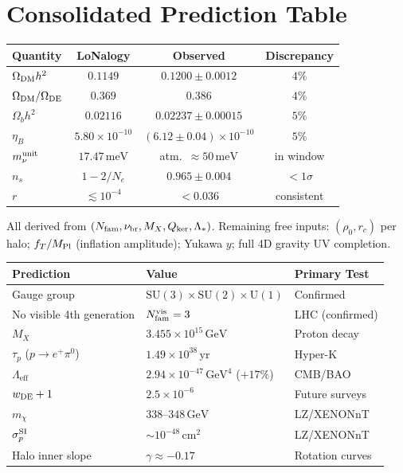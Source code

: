 \documentclass[12pt]{article}
\theoremstyle{plain}
\theoremstyle{definition}
\numberwithin{equation}{section}
\newcommand{\br}{\mathrm{br}}
\newcommand{\kker}{\mathrm{ker}}
\newcommand{\eff}{\mathrm{eff}}
\begin{document}
\section{Consolidated Prediction Table}\label{sec:summary2}

\begin{center}
\begin{tabular}{lccc}
\toprule
Quantity & LoNalogy & Observed & Discrepancy\\
\midrule
$\Omega_{\rm DM}h^2$ & $0.1149$ & $0.1200\pm0.0012$ & $4\%$\\
$\Omega_{\rm DM}/\Omega_{\rm DE}$ & $0.369$ & $0.386$ & $4\%$\\
$\Omega_b h^2$ & $0.02116$ & $0.02237\pm0.00015$ & $5\%$\\
$\eta_B$ & $5.80\times10^{-10}$ & $(6.12\pm0.04)\times10^{-10}$ & $5\%$\\
$m_\nu^{\rm unit}$ & $17.47\,\mathrm{meV}$ & atm.\ $\approx50\,\mathrm{meV}$ & in window\\
$n_s$ & $1-2/N_e$ & $0.965\pm0.004$ & $<1\sigma$\\
$r$ & $\lesssim10^{-4}$ & $<0.036$ & consistent\\
\bottomrule
\end{tabular}
\end{center}

All derived from $(N_{\rm fam},\nu_\br,M_X,Q_{\kker},\Lambda_*)$. Remaining free inputs: $(\rho_0,r_c)$ per halo; $f_T/M_{\rm Pl}$ (inflation amplitude); Yukawa $y$; full 4D gravity UV completion.

\begin{center}
\begin{tabular}{p{4.5cm}p{4cm}p{4cm}}
\toprule
Prediction & Value & Primary Test\\
\midrule
Gauge group & $\mathrm{SU}(3)\times\mathrm{SU}(2)\times\mathrm{U}(1)$ & Confirmed\\
No visible 4th generation & $N_{\rm fam}^{\rm vis}=3$ & LHC (confirmed)\\
$M_X$ & $3.455\times10^{15}\,\mathrm{GeV}$ & Proton decay\\
$\tau_p$ ($p\to e^+\pi^0$) & $1.49\times10^{38}\,\mathrm{yr}$ & Hyper-K\\
$\Lambda_\eff$ & $2.94\times10^{-47}\,\mathrm{GeV}^4$ ($+17\%$) & CMB/BAO\\
$w_{\rm DE}+1$ & $2.5\times10^{-6}$ & Future surveys\\
$m_\chi$ & $338$--$348\,\mathrm{GeV}$ & LZ/XENONnT\\
$\sigma_p^{\rm SI}$ & $\sim10^{-48}\,\mathrm{cm}^2$ & LZ/XENONnT\\
Halo inner slope & $\gamma\approx-0.17$ & Rotation curves\\
\bottomrule
\end{tabular}
\end{center}
\end{document}
